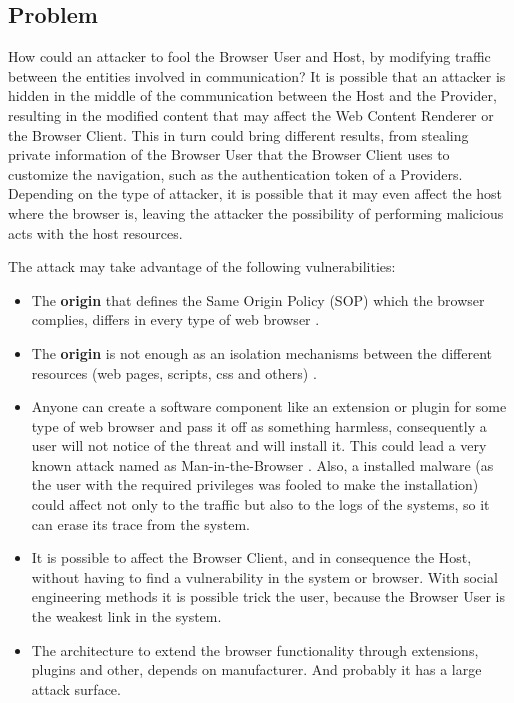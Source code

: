 \documentclass{sig-alternate-05-2015}
\begin{document}
\subsection*{Problem}
How could an attacker to fool the Browser User and Host, by modifying traffic between the entities involved in communication? It is possible that an attacker is hidden in the middle of the communication between the Host and the Provider, resulting in the modified content that may affect the Web Content Renderer or the Browser Client. This in turn could bring different results, from stealing private information of the Browser User that the Browser Client uses to customize the navigation, such as the authentication token of a Providers. Depending on the type of attacker, it is possible that it may even affect the host where the browser is, leaving the attacker the possibility of performing malicious acts with the host resources.

The attack may take advantage of the following vulnerabilities:
\begin{itemize}
  \item The \textbf{origin} that defines the Same Origin Policy (SOP) which the browser complies, differs in every type of web browser \cite{W3C-SOP,Reis2009, Jackson2008, Crowley2010, Paola2006}.
  \item The \textbf{origin} is not enough as an isolation mechanisms between the different resources (web pages, scripts, css and others) \cite{Silic2010, Barth2009, Yason, Liu2012}.
  \item Anyone can create a software component like an extension or plugin for some type of web browser and pass it off as something harmless, consequently a user will not notice of the threat and will install it. This could lead a very known attack named as Man-in-the-Browser \cite{Dougan2012,Utakrit2009,Liu2012,Barth2010}. Also, a installed malware (as the user with the required privileges was fooled to make the installation) could affect not only to the traffic but also to the logs of the systems, so it can erase its trace from the system.
  \item It is possible to affect the Browser Client, and in consequence the Host, without having to find a vulnerability in the system or browser. With social engineering methods it is possible trick the user, because the Browser User is the weakest link in the system.
  \item The architecture to extend the browser functionality through extensions, plugins and other, depends on manufacturer. And probably it has a large attack surface.
\end{itemize}
\end{document}

